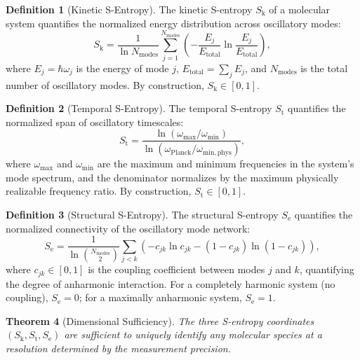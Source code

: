 \documentclass[11pt,twocolumn,a4paper]{article}
\newtheorem{theorem}{Theorem}[section]
\theoremstyle{definition}
\newtheorem{definition}[theorem]{Definition}
\theoremstyle{remark}
\newcommand{\Sk}{S_{\mathrm{k}}}
\newcommand{\St}{S_{\mathrm{t}}}
\newcommand{\Se}{S_{\mathrm{e}}}
\begin{document}
\begin{definition}[Kinetic S-Entropy]\label{def:sk}
The kinetic S-entropy $\Sk$ of a molecular system quantifies the normalized energy distribution across oscillatory modes:
\begin{equation}\label{eq:sk}
  \Sk = \frac{1}{\ln N_{\mathrm{modes}}} \sum_{j=1}^{N_{\mathrm{modes}}} \left( -\frac{E_j}{E_{\mathrm{total}}} \ln \frac{E_j}{E_{\mathrm{total}}} \right),
\end{equation}
where $E_j = \hbar \omega_j$ is the energy of mode $j$, $E_{\mathrm{total}} = \sum_j E_j$, and $N_{\mathrm{modes}}$ is the total number of oscillatory modes. By construction, $\Sk \in [0, 1]$.
\end{definition}

\begin{definition}[Temporal S-Entropy]\label{def:st}
The temporal S-entropy $\St$ quantifies the normalized span of oscillatory timescales:
\begin{equation}\label{eq:st}
  \St = \frac{\ln(\omega_{\max}/\omega_{\min})}{\ln(\omega_{\mathrm{Planck}}/\omega_{\mathrm{min,phys}})},
\end{equation}
where $\omega_{\max}$ and $\omega_{\min}$ are the maximum and minimum frequencies in the system's mode spectrum, and the denominator normalizes by the maximum physically realizable frequency ratio. By construction, $\St \in [0, 1]$.
\end{definition}

\begin{definition}[Structural S-Entropy]\label{def:se}
The structural S-entropy $\Se$ quantifies the normalized connectivity of the oscillatory mode network:
\begin{equation}\label{eq:se}
  \Se = \frac{1}{\ln \binom{N_{\mathrm{modes}}}{2}} \sum_{j < k} \left( -c_{jk} \ln c_{jk} - (1 - c_{jk}) \ln(1 - c_{jk}) \right),
\end{equation}
where $c_{jk} \in [0, 1]$ is the coupling coefficient between modes $j$ and $k$, quantifying the degree of anharmonic interaction. For a completely harmonic system (no coupling), $\Se = 0$; for a maximally anharmonic system, $\Se = 1$.
\end{definition}

\begin{theorem}[Dimensional Sufficiency]\label{thm:dim-suff}
The three S-entropy coordinates $(\Sk, \St, \Se)$ are sufficient to uniquely identify any molecular species at a resolution determined by the measurement precision.
\end{theorem}
\end{document}
